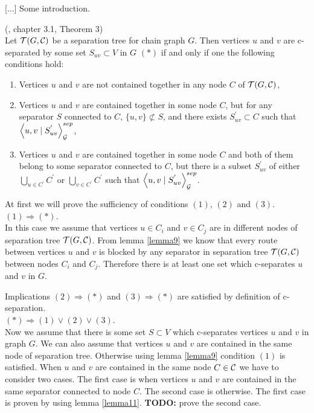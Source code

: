%
%

[...] Some introduction.


\begin{thm} \label{LCDSkeletonThm} (\cite{CG}, chapter 3.1, Theorem 3) \\ 
	Let $\mathcal{T}(G, \mathcal{C})$ be a separation tree for chain graph $G$. Then vertices $u$ and $v$ are 
	c-separated by some set $S_{uv} \subset V$ in $G$ $(*)$ if and only if one the following conditions hold:
	
	\begin{enumerate}
		\item Vertices $u$ and $v$ are not contained together in any node $C$ of $\mathcal{T}(G, \mathcal{C})$,
		
		\item Vertices $u$ and $v$ are contained together in some node $C$, but for any separator $S$ connected
		to $C$, $\{u, v \} \not \subset S$, and there exists $S_{uv}^{'} \subset C$ such 
		that $\left\langle u , v \mid S_{uv}^{'} \right\rangle_{\mathcal{G}}^{sep}$,
		
		\item Vertices $u$ and $v$ are contained together in some node $C$ and both of them belong to some separator
		connected to $C$, but there is a subset $S_{uv}^{'}$ of either $\bigcup_{u \in C^{'}} C^{'}$ or
		$\bigcup_{v \in C^{'}} C^{'}$ such that $\left\langle u , v \mid S_{uv}^{'} \right\rangle_{\mathcal{G}}^{sep}$.
	\end{enumerate}
\end{thm}

\begin{prf}
	At first we will prove the sufficiency of conditions $(1)$, $(2)$ and $(3)$. \\ 

	$(1) \Rightarrow (*)$. \\
	In this case we assume that vertices $u \in C_i$ and $v \in C_j$ are in different nodes of separation tree $\mathcal{T}(G, \mathcal{C})$.
	From lemma \ref{lemma9} we know that every route between vertices $u$ and $v$ is blocked by any separator in separation tree
	$\mathcal{T}(G, \mathcal{C})$ between nodes $C_i$ and $C_j$. Therefore there is at least one set which c-separates $u$ and $v$ in $G$.

	Implications $(2) \Rightarrow (*)$ and $(3) \Rightarrow (*)$ are satisfied by definition of c-separation. \\ 

	$(*) \Rightarrow (1) \vee (2) \vee (3) $. \\
	Now we assume that there is some set $S \subset V$ which c-separates vertices $u$ and $v$ in graph $G$.
	We can also assume that vertices $u$ and $v$ are contained in the same node of separation tree. Otherwise
	using lemma \ref{lemma9} condition $(1)$ is satisfied. When $u$ and $v$ are contained in the same node $C \in \mathcal{C}$ we
	have to consider two cases. The first case is when vertices $u$ and $v$ are contained in the same separator connected to 
	node $C$. The second case is otherwise. The first case is proven by using lemma \ref{lemma11}.
	\textbf{TODO:} prove the second case.
	\QED
\end{prf}

